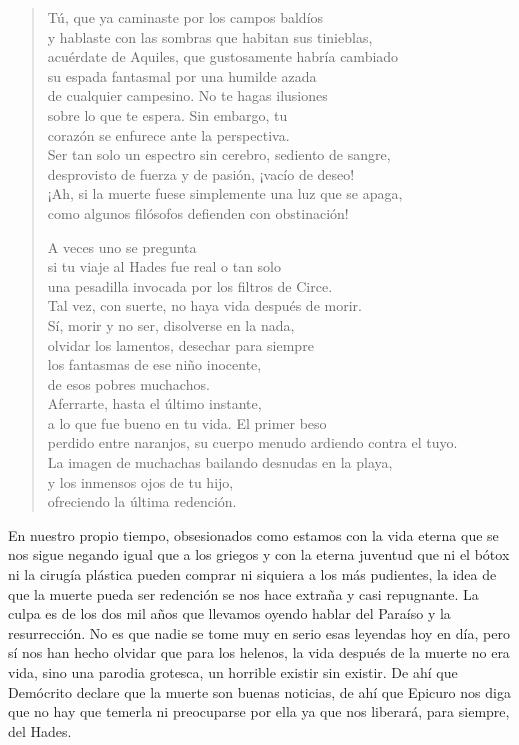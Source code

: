 \documentclass[11pt,a4paper]{article}
\begin{document}
\begin{verse}
Tú, que ya caminaste por los campos baldíos\\
y hablaste con las sombras que habitan sus tinieblas,\\
acuérdate de Aquiles, que gustosamente habría cambiado\\
su espada fantasmal por una humilde azada\\
de cualquier campesino. No te hagas ilusiones\\
sobre lo que te espera. Sin embargo, tu\\
corazón se enfurece ante la perspectiva.\\
Ser tan solo un espectro sin cerebro, sediento de sangre,\\
desprovisto de fuerza y de pasión, ¡vacío de deseo!\\
¡Ah, si la muerte fuese simplemente una luz que se apaga,\\
como algunos filósofos defienden con obstinación!

A veces uno se pregunta\\
si tu viaje al Hades fue real o tan solo\\
una pesadilla invocada por los filtros de Circe.\\
Tal vez, con suerte, no haya vida después de morir.\\
Sí, morir y no ser, disolverse en la nada,\\
olvidar los lamentos, desechar para siempre\\
los fantasmas de ese niño inocente,\\
de esos pobres muchachos.\\
Aferrarte, hasta el último instante,\\
a lo que fue bueno en tu vida. El primer beso\\
perdido entre naranjos, su cuerpo menudo ardiendo contra el tuyo.\\
La imagen de muchachas bailando desnudas en la playa,\\
y los inmensos ojos de tu hijo,\\
ofreciendo la última redención.
\end{verse}

En nuestro propio tiempo, obsesionados como estamos con la vida eterna que se nos sigue negando igual que a los griegos y con la eterna juventud que ni el bótox ni la cirugía plástica pueden comprar ni siquiera a los más pudientes, la idea de que la muerte pueda ser redención se nos hace extraña y casi repugnante. La culpa es de los dos mil años que llevamos oyendo hablar del Paraíso y la resurrección. No es que nadie se tome muy en serio esas leyendas hoy en día, pero sí nos han hecho olvidar que para los helenos, la vida después de la muerte no era vida, sino una parodia grotesca, un horrible existir sin existir. De ahí que Demócrito declare que la muerte son buenas noticias, de ahí que Epicuro nos diga que no hay que temerla ni preocuparse por ella ya que nos liberará, para siempre, del Hades.
\end{document}
